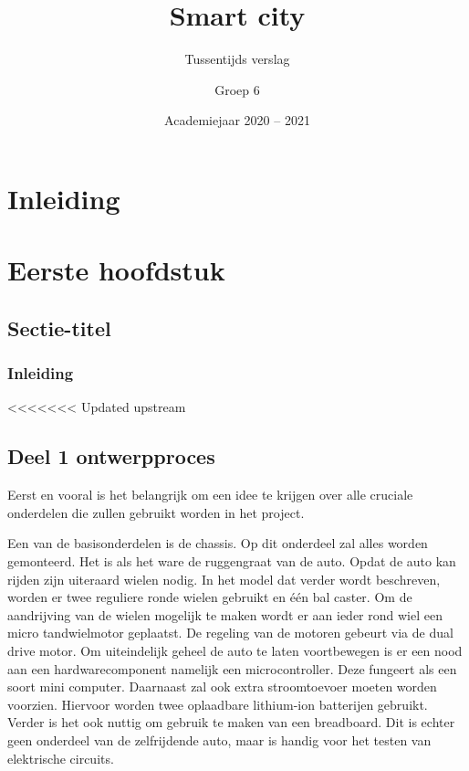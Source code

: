\documentclass[a4paper,twoside,kulak]{kulakreport} %
\title{Smart city}
\subtitle{Tussentijds verslag}
\author{Groep 6}
\institute{KU Leuven Kulak, Wetenschap \& Technologie}
\date{Academiejaar 2020 -- 2021}
\begin{document}

\titlepage

\tableofcontents

\chapter*{Inleiding}

\chapter{Eerste hoofdstuk}
\section{Sectie-titel}
\subsection*{Inleiding}

<<<<<<< Updated upstream
\section{Deel 1 ontwerpproces}

Eerst en vooral is het belangrijk om een idee te krijgen over alle cruciale onderdelen die zullen gebruikt worden in het project. 

Een van de basisonderdelen is de chassis. Op dit onderdeel zal alles worden gemonteerd. Het is als het ware de ruggengraat van de auto.%
Opdat de auto kan rijden zijn uiteraard wielen nodig. In het model dat verder wordt beschreven, worden er twee reguliere ronde wielen gebruikt en één bal caster. Om de aandrijving van de wielen mogelijk te maken wordt er aan ieder rond wiel een micro tandwielmotor geplaatst. De regeling van de motoren gebeurt via de dual drive motor. Om uiteindelijk geheel de auto te laten voortbewegen is er een nood aan een hardwarecomponent namelijk een microcontroller. Deze fungeert als een soort mini computer. Daarnaast zal ook extra stroomtoevoer moeten worden voorzien. Hiervoor worden twee oplaadbare lithium-ion batterijen gebruikt. Verder is het ook nuttig om gebruik te maken van een breadboard. Dit is echter geen onderdeel van de zelfrijdende auto, maar is handig voor het testen van elektrische circuits.
\end{document}
